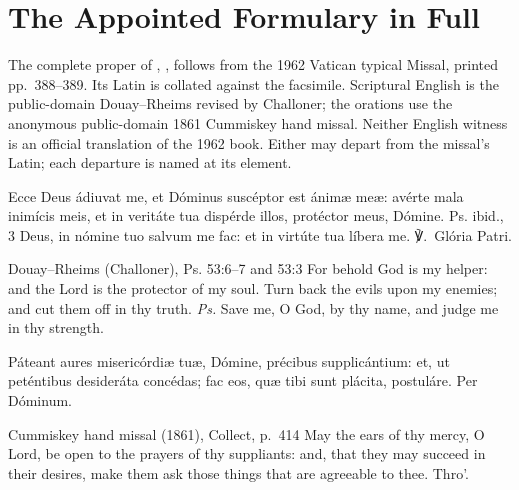 \section*{The Appointed Formulary in Full}

The complete proper of ,
, follows from the 1962 Vatican typical Missal, printed
pp.~388--389. Its Latin is collated against the facsimile. Scriptural
English is the public-domain
Douay--Rheims revised by Challoner; the orations use the anonymous
public-domain 1861 Cummiskey hand missal. Neither English witness is an
official translation of the 1962 book. Either may depart from the missal's
Latin; each departure is named at its element.

\begingroup\small
{}
Ecce Deus ádiuvat me, et Dóminus suscéptor est ánimæ meæ: avérte mala
inimícis meis, et in veritáte tua dispérde illos, protéctor meus, Dómine.
\textnormal{Ps. ibid., 3} Deus, in nómine tuo salvum me fac: et in virtúte tua
líbera me. \textnormal{℣.~Glória Patri.}
\finishfulltextelement
\begin{fulltextenglish}{Douay--Rheims (Challoner), Ps. 53:6--7 and 53:3}
For behold God is my helper: and the Lord is the protector of my soul. Turn
back the evils upon my enemies; and cut them off in thy truth. \textit{Ps.}
Save me, O God, by thy name, and judge me in thy strength.
\end{fulltextenglish}

Páteant aures misericórdiæ tuæ, Dómine, précibus supplicántium: et, ut
peténtibus desideráta concédas; fac eos, quæ tibi sunt plácita, postuláre.
Per Dóminum.
\finishfulltextelement
\begin{fulltextenglish}{Cummiskey hand missal (1861), Collect, p.~414}
May the ears of thy mercy, O Lord, be open to the prayers of thy suppliants:
and, that they may succeed in their desires, make them ask those things that
are agreeable to thee. Thro'.
\end{fulltextenglish}

